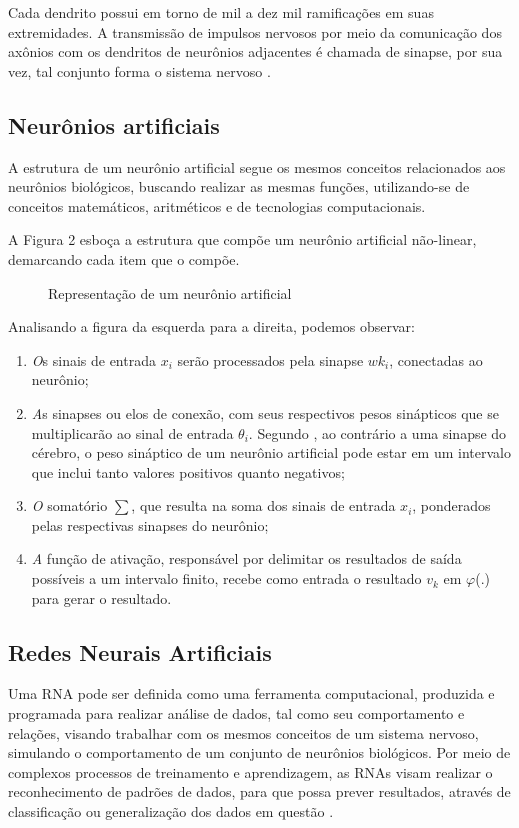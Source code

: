 Cada dendrito possui em torno de mil a dez mil ramificações em suas extremidades. A transmissão de impulsos nervosos por meio da comunicação dos axônios com os dendritos de neurônios adjacentes é chamada de sinapse, por sua vez, tal conjunto forma o sistema nervoso \cite{neto}.

\subsection{Neurônios artificiais}
A estrutura de um neurônio artificial segue os mesmos conceitos relacionados aos neurônios biológicos, buscando realizar as mesmas funções, utilizando-se de conceitos matemáticos, aritméticos e de tecnologias computacionais.

A Figura 2 esboça a estrutura que compõe um neurônio artificial não-linear, demarcando cada item que o compõe. 

\begin{figure}[h]
	\centering
	\caption{Representação de um neurônio artificial}
	\label{exec-linearmente-separavel}
\end{figure}

Analisando a figura da esquerda para a direita, podemos observar: 

\begin{enumerate}
	\item \textit Os sinais de entrada $x_i$ serão processados pela sinapse $wk_i$, conectadas ao neurônio;
	\item \textit As sinapses ou elos de conexão, com seus respectivos pesos sinápticos que se multiplicarão ao sinal de entrada $\theta_i$. Segundo , ao contrário a uma sinapse do cérebro, o peso sináptico de um neurônio artificial pode estar em um intervalo que inclui tanto valores positivos quanto negativos;
	\item \textit O somatório $\sum$, que resulta na soma dos sinais de entrada $x_i$, ponderados pelas respectivas sinapses do neurônio;
	\item \textit A função de ativação, responsável por delimitar os resultados de saída possíveis a um intervalo finito, recebe como entrada o resultado $v_k$ em $\varphi$(.) para gerar o resultado.
\end{enumerate}

\subsection{Redes Neurais Artificiais}\label{sec:redes-neurais}
Uma RNA pode ser definida como uma ferramenta computacional, produzida e programada para realizar análise de dados, tal como seu comportamento e relações, visando trabalhar com os mesmos conceitos de um sistema nervoso, simulando o comportamento de um conjunto de neurônios biológicos. Por meio de complexos processos de treinamento e aprendizagem, as RNAs visam realizar o reconhecimento de padrões de dados, para que possa prever resultados, através de classificação ou generalização dos dados em questão \cite{haykin2009}.

